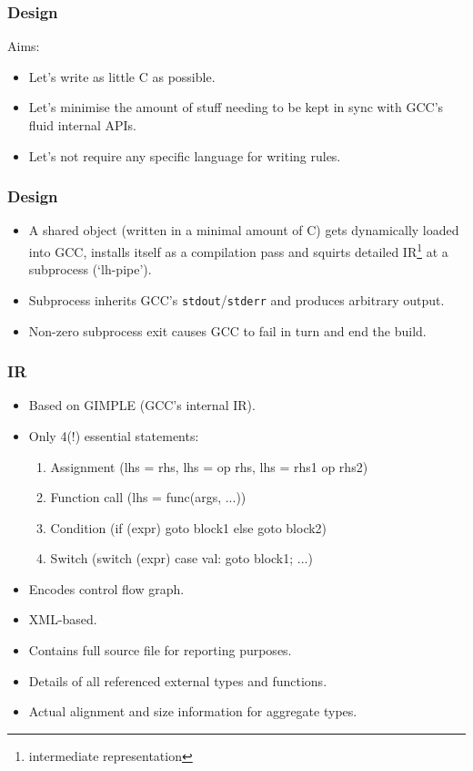 \documentclass{beamer}
\begin{document}
\frame
{
  \frametitle{Design}
  Aims:

  \begin{itemize}
  \item<1-> Let's write as little C as possible.
  \item<2-> Let's minimise the amount of stuff needing to be kept in sync with GCC's fluid
            internal APIs.
  \item<3-> Let's not require any specific language for writing rules.
  \end{itemize}
}

\frame
{
  \frametitle{Design}
  \begin{itemize}
    \item<1-> A shared object (written in a minimal amount of C) gets dynamically loaded into
              GCC, installs itself as a compilation pass and squirts detailed IR\footnote{intermediate representation}
              at a subprocess (`lh-pipe').
    \item<2-> Subprocess inherits GCC's \texttt{stdout}/\texttt{stderr} and produces arbitrary output.
    \item<3-> Non-zero subprocess exit causes GCC to fail in turn and end the build.
  \end{itemize}
}

\frame
{
  \frametitle{IR}

  \begin{itemize}
    \item<1-> Based on GIMPLE (GCC's internal IR).
     \item<2-> Only 4(!) essential statements:
     \begin{enumerate}
       \item<3->{Assignment (lhs = rhs, lhs = op rhs, lhs = rhs1 op rhs2)}
       \item<4->{Function call (lhs = func(args, ...))}
       \item<5->{Condition (if (expr) goto block1 else goto block2)}
       \item<6->{Switch (switch (expr) case val: goto block1; ...)}
    \end{enumerate}
    \item<7-> Encodes control flow graph.
    \item<8-> XML-based.
    \item<9-> Contains full source file for reporting purposes.
    \item<10-> Details of all referenced external types and functions.
    \item<11-> Actual alignment and size information for aggregate types.
  \end{itemize}
}
\end{document}
